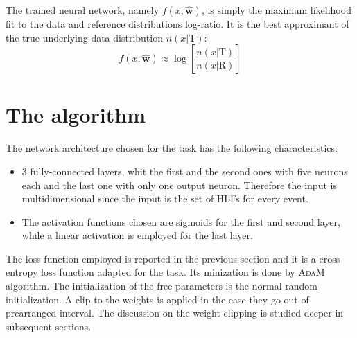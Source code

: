 The trained neural network, namely $f(x;\hat{\mathbf{w}})$, is simply the maximum likelihood fit to the data and reference distributions log-ratio. It is the best approximant of the true underlying data distribution $n(x|\mathrm{T})$:
\begin{equation}
	f(x;\hat{\mathbf{w}}) \approx \log{ \left[
	\frac{n(x|\mathrm{T})}{n(x|\mathrm{R})}
	\right] }
\end{equation}


\section{The algorithm}
The network architecture chosen for the task has the following characteristics:
\begin{itemize}
	\item 3 fully-connected layers, whit the first and the second ones with five neurons each and the last one with only one output neuron. Therefore the input is multidimensional since the input is the set of HLFs for every event.
	\item The activation functions chosen are sigmoids for the first and second layer, while a linear activation is employed for the last layer.
\end{itemize}

The loss function employed is reported in the previous section and it is a cross entropy loss function adapted for the task. Its minization is done by \textsc{AdaM} algorithm. The initialization of the free parameters is the normal random initialization. A clip to the weights is applied in the case they go out of prearranged interval. The discussion on the weight clipping is studied deeper in subsequent sections.

